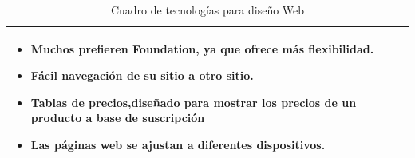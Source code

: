 \begin{table}[b!]
\begin{tabular}{|p{1cm}|l}
{\begin{itemize}
			\item Muchos prefieren Foundation, ya que ofrece más flexibilidad.
			\item Fácil navegación de su sitio a otro sitio.
            \item Tablas de precios,diseñado para mostrar los precios de un producto a base de suscripción
            \item Las páginas web se ajustan a diferentes dispositivos.
            \cite{35}
         \end{itemize}}\\ 
        \hline
      \end{tabular}
      \caption{Cuadro de tecnologías para diseño Web}
      \label{table:Cuadro comparativo de tecnologias web}
    \end{table}

